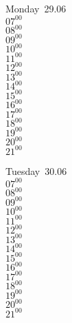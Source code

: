 \documentclass[11pt,a4paper]{book}\usepackage[]{graphicx}\usepackage[]{color}
\begin{document}




\vspace{2 mm}\\
\begin{tcolorbox}
Monday~29.06\\
{ 
  $07^{00}$\\
$08^{00}$\\
$09^{00}$\\
$10^{00}$\\
$11^{00}$\\
$12^{00}$\\
$13^{00}$\\
$14^{00}$\\
$15^{00}$\\
$16^{00}$\\
$17^{00}$\\
$18^{00}$\\
$19^{00}$\\
$20^{00}$\\
$21^{00}$}\\

\end{tcolorbox}
\begin{tcolorbox}
Tuesday~30.06\\
{ 
  $07^{00}$\\
$08^{00}$\\
$09^{00}$\\
$10^{00}$\\
$11^{00}$\\
$12^{00}$\\
$13^{00}$\\
$14^{00}$\\
$15^{00}$\\
$16^{00}$\\
$17^{00}$\\
$18^{00}$\\
$19^{00}$\\
$20^{00}$\\
$21^{00}$}\\

\end{tcolorbox}
\end{document}
